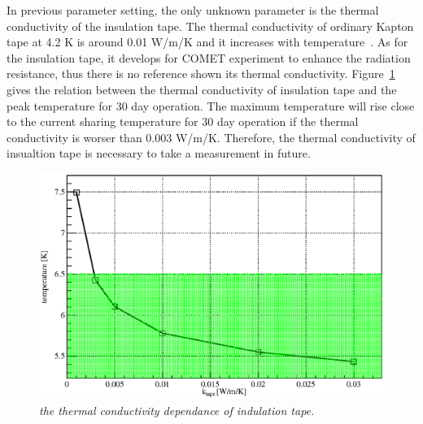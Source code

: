 In previous parameter setting, the only unknown parameter is the thermal conductivity of the insulation tape.
The thermal conductivity of ordinary Kapton tape at 4.2 K is around 0.01 W/m/K and it increases with temperature~\cite{rss90}.
As for the insulation tape, it develops for COMET experiment to enhance the radiation resistance, thus there is no reference shown its thermal conductivity.
Figure~\ref{4tape} gives the relation between the thermal conductivity of insulation tape and the peak temperature for 30 day operation.
The maximum temperature will rise close to the current sharing temperature for 30 day operation if the thermal conductivity is worser than 0.003 W/m/K.
Therefore, the thermal conductivity of insualtion tape is necessary to take a measurement in future.
 \begin{figure}[H]
  \centering
  \includegraphics[scale=0.45]{chapter6/fig/tape.eps}
  \caption{\it the thermal conductivity dependance of indulation tape.}
  \label{4tape}
 \end{figure}

